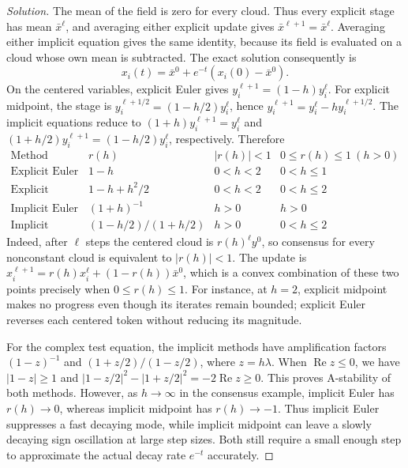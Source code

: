 \documentclass[11pt]{amsart}
\numberwithin{equation}{section}
\theoremstyle{plain}
\newcommand{\abs}[1]{\left\lvert#1\right\rvert}
\begin{document}
\begin{proof}[Solution]
The mean of the field is zero for every cloud.  Thus every explicit stage
has mean $\bar x^\ell$, and averaging either explicit update gives
$\bar x^{\ell+1}=\bar x^\ell$.  Averaging either implicit equation gives the
same identity, because its field is evaluated on a cloud whose own mean is
subtracted.  The exact solution consequently is
\[
 x_i(t)=\bar x^0+e^{-t}(x_i(0)-\bar x^0).
\]
On the centered variables, explicit Euler gives
$y_i^{\ell+1}=(1-h)y_i^\ell$.  For explicit midpoint, the stage is
$y_i^{\ell+1/2}=(1-h/2)y_i^\ell$, hence
$y_i^{\ell+1}=y_i^\ell-hy_i^{\ell+1/2}$.
The implicit equations reduce to
$(1+h)y_i^{\ell+1}=y_i^\ell$ and
$(1+h/2)y_i^{\ell+1}=(1-h/2)y_i^\ell$, respectively.  Therefore
\[
\begin{array}{c|c|c|c}
 \text{Method}&r(h)&\abs{r(h)}<1&0\leq r(h)\leq1\ (h>0)\\ \hline
 \text{Explicit Euler}&1-h&0<h<2&0<h\leq1\\
 \text{Explicit midpoint}&1-h+h^2/2&0<h<2&0<h\leq2\\
 \text{Implicit Euler}&(1+h)^{-1}&h>0&h>0\\
 \text{Implicit midpoint}&(1-h/2)/(1+h/2)&h>0&0<h\leq2
\end{array}
\]
Indeed, after $\ell$ steps the centered cloud is $r(h)^\ell y^0$, so
consensus for every nonconstant cloud is equivalent to $\abs{r(h)}<1$.
The update is $x_i^{\ell+1}=r(h)x_i^\ell+(1-r(h))\bar x^0$, which is a
convex combination of these two points precisely when $0\leq r(h)\leq1$.
For instance, at $h=2$, explicit midpoint makes no progress even though
its iterates remain bounded; explicit Euler reverses each centered token
without reducing its magnitude.

For the complex test equation, the implicit methods have amplification
factors $(1-z)^{-1}$ and $(1+z/2)/(1-z/2)$, where $z=h\lambda$.
When $\operatorname{Re}z\leq0$, we have $\abs{1-z}\geq1$ and
$\abs{1-z/2}^2-\abs{1+z/2}^2=-2\operatorname{Re}z\geq0$.
This proves A-stability of both methods.  However, as $h\to\infty$ in the
consensus example, implicit Euler has $r(h)\to0$, whereas implicit midpoint
has $r(h)\to-1$.  Thus implicit Euler suppresses a fast decaying mode, while
implicit midpoint can leave a slowly decaying sign oscillation at large
step sizes.  Both still require a small enough step to approximate the
actual decay rate $e^{-t}$ accurately.
\end{proof}
\end{document}
